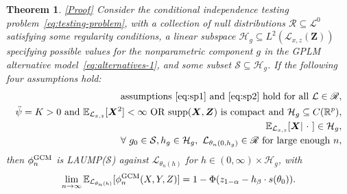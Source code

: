 \documentclass[12pt]{article}
\newtheorem{theorem}{Theorem}
\theoremstyle{definition}
\theoremstyle{remark}
\newcommand{\E}{\mathbb E}								%
\newcommand{\R}{\mathbb{R}}								%
\newcommand{\prx}{\bm X}								%
\newcommand{\srx}{X}									%
\newcommand{\prz}{\bm Z}								%
\newcommand{\srz}{Z}									%
\newcommand{\sry}{Y}									%
\newcommand{\law}{\mathcal L}							%
\newcommand{\nulllaws}{\mathscr L^0}					%
\newcommand{\regclass}{\mathscr R}					    %
\newcommand{\GCM}{\textnormal{GCM}}						%
\renewcommand{\H}{\mathcal H}		 					%
\begin{document}
	\begin{theorem} \label{thm:optimality} \hyperref[sec:optimality-proof]{\textnormal{[Proof]}}
		Consider the conditional independence testing problem~\eqref{eq:testing-problem}, with a collection of null distributions $\regclass\subseteq\nulllaws$ satisfying some regularity conditions, a linear subspace $\H_g \subseteq L^2(\law_{x,z}(\bm Z))$ specifying possible values for the nonparametric component $g$ in the GPLM alternative model~\eqref{eq:alternatives-1}, and some subset $\mathcal S \subseteq \H_g$. If the following four assumptions hold:
		\begin{align}
			\text{assumptions \eqref{eq:sp1} and \eqref{eq:sp2} hold for all } \law \in \regclass, \label{eq:sp-assumptions}\\
			\ddot{\psi} = K > 0 \text{ and } \E_{\law_{x,z}}[\prx^2] < \infty \text{ OR } \mathrm{supp}(\prx, \prz) \text{ is compact and } \H_g \subseteq C(\R^p), \label{eq:moment-assumptions}\\
			\E_{\law_{x,z}}[\prx|\ \cdot \ ] \in \H_g, \label{eq:conditional-expectation} \\
			\forall\ g_0\in\mathcal{S}, h_g \in \H_g, \ \law_{\theta_n(0, h_g)} \in \regclass \text{ for large enough } n, \label{eq:interior-point}
		\end{align}
		then $\phi_n^{\GCM}$ is LAUMP($\mathcal{S}$) against $\law_{\theta_n(h)}$ for $h \in (0, \infty) \times \H_g$, with 
		\begin{equation}
			\lim_{n \rightarrow \infty}\E_{\law_{\theta_n(h)}}[\phi_n^{\GCM}(\srx, \sry, \srz)] = 1 - \Phi(z_{1-\alpha} - h_\beta \cdot s(\theta_0)).
			\label{eq:power-of-gcm-test}
		\end{equation}
	\end{theorem}
	
\end{document}
